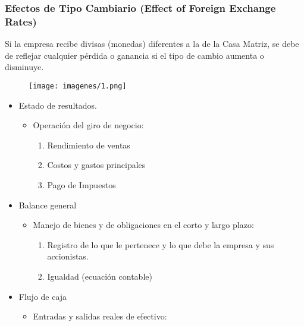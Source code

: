 \subsubsection{Efectos de Tipo Cambiario (Effect of Foreign Exchange Rates)}
    Si la empresa recibe divisas (monedas) diferentes a la de la Casa Matriz, se  debe  de  reflejar  cualquier  pérdida  o  ganancia  si  el  tipo  de  cambio aumenta o disminuye.

    \begin{figure}[H]
        \centering
        \texttt{[image: imagenes/1.png]}
    \end{figure}
    
    



    \begin{cajita}
        \begin{itemize}
            \item Estado de resultados. 
            \begin{itemize}
                \item Operación del giro de negocio: 
                \begin{enumerate}
                    \item Rendimiento de ventas
                    \item Costos y gastos principales 
                    \item Pago de Impuestos
                \end{enumerate}
            \end{itemize}
            \item Balance general 
            \begin{itemize}
                \item Manejo de bienes y de obligaciones en el corto y largo plazo: 
                \begin{enumerate}
                    \item Registro de lo que le pertenece y lo que debe la empresa y sus accionistas. 
                    \item Igualdad (ecuación contable)
                \end{enumerate}
            \end{itemize}
            \item Flujo de caja
            \begin{itemize}
                \item Entradas y salidas reales de efectivo: 
                \begin{enumerate}

\end{enumerate}
\end{itemize}
\end{itemize}
\end{cajita}
